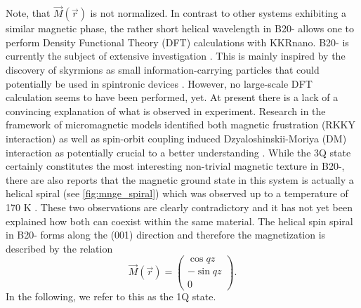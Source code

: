 \documentclass[graybox]{svmult}
\newcommand{\beq}{\begin{equation}}
\newcommand{\eeq}{\end{equation}}
\begin{document}
Note, that $\vec{M}(\vec{r})$ is not normalized.
In contrast to other systems exhibiting a
similar magnetic phase, the rather short helical wavelength in B20- allows one to perform
Density Functional Theory (DFT) 
calculations with KKRnano.
B20- is currently the subject of extensive
investigation
\cite{kanazawa_large_2011,kanazawa_possible_2012,grigoriev_chiral_2013,tanigaki_real-space_2015,martin_magnetic_2016}.
This is mainly inspired by the discovery of skyrmions as small information-carrying particles
that could potentially be used in spintronic devices \cite{fert_magnetic_2017}.
However, no large-scale DFT calculation seems to have been performed, yet.
At present there is a lack of a convincing explanation
of what is observed in experiment. Research in the framework of micromagnetic models identified both
magnetic frustration (RKKY interaction) as well as spin-orbit coupling induced Dzyaloshinskii-Moriya (DM)
interaction as potentially crucial to a better
understanding \cite{altynbaev_hidden_2016,koretsune_control_2015}. 
While the 3Q state certainly constitutes the most interesting non-trivial magnetic texture 
in B20-, there are also reports that the magnetic ground state in this system is
actually a helical spiral (see \cref{fig:mnge_spiral}) \cite{yaouanc_magnetic_2017} which was observed up
to a temperature of 170 K \cite{makarova_neutron_2012}.
These two observations are clearly contradictory and it has not yet been explained how
both can coexist within the same material.
The helical spin spiral in B20- forms along the (001) direction and therefore the magnetization
is described by the relation
\beq
\label{eq:1q_spiral}
\vec{M}(\vec{r}) =
\begin{pmatrix}
	 \cos{qz} \\
	-\sin{qz}  \\
	0
\end{pmatrix}
.
\eeq
In the following, we refer to this as the 1Q state.
\end{document}
